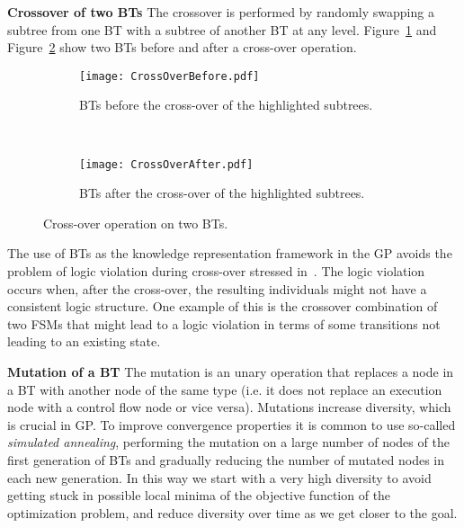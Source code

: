 \textbf{Crossover of two BTs}
The crossover is performed by randomly swapping a subtree from one BT with a subtree of another BT at any level. Figure~\ref{PA.fig.CrossoverBefore} and Figure~\ref{PA.fig.CrossoverAfter} show two BTs before and after a cross-over operation.

\begin{figure}[h]
\centering
\begin{subfigure}[b]{0.7\columnwidth}
\texttt{[image: CrossOverBefore.pdf]}
\caption{BTs before the cross-over of the highlighted subtrees.}
\label{PA.fig.CrossoverBefore}
\end{subfigure}
~
\begin{subfigure}[b]{0.7\columnwidth}
\centering
\texttt{[image: CrossOverAfter.pdf]}
\caption{BTs after the cross-over of the highlighted subtrees.}
\label{PA.fig.CrossoverAfter}
\end{subfigure}
\caption{Cross-over operation on two BTs.}
\label{PA.fig.Crossover}
\end{figure}

\begin{remark}
The use of BTs as the knowledge representation framework in the GP avoids the problem of logic violation during cross-over stressed in~\cite{fu2003genetic}. The logic violation occurs when, after the cross-over, the resulting individuals might not have a  consistent logic structure. One example of this is the crossover combination of two FSMs that might lead to a logic violation in terms of some transitions not leading to an existing state.
\end{remark}

\textbf{Mutation of a BT}
\label{bg.mutation}
The mutation is an unary operation that replaces a node in a BT with another node of the same type (i.e. it does not replace an execution node with a control flow node or vice versa). Mutations increase diversity, which is crucial in GP. To improve convergence properties it is common to use  so-called \emph{simulated annealing}, performing the mutation on a large number of nodes of the first generation of BTs and gradually reducing  the number of mutated nodes in each new generation. In this way we start with a very high diversity to avoid getting stuck in possible local minima of the objective function of the optimization problem, and  reduce diversity over time as we get closer to the goal.

